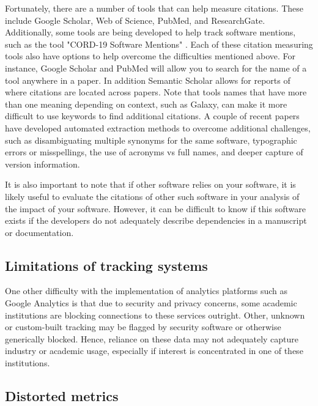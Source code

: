 \documentclass{article}
\begin{document}
Fortunately, there are a number of tools that can help measure citations. These include Google Scholar, Web of Science, PubMed, and ResearchGate. Additionally, some tools are being developed to help track software mentions, such as the tool "CORD-19 Software Mentions" \cite{wade_cord-19_2021}. Each of these citation measuring tools also have options to help overcome the difficulties mentioned above. For instance, Google Scholar and PubMed will allow you to search for the name of a tool anywhere in a paper. In addition Semantic Scholar allows for reports of where citations are located across papers. Note that tools names that have more than one meaning depending on context, such as Galaxy, can make it more difficult to use keywords to find additional citations. A couple of recent papers \cite{istrate_large_2022, schindler_role_2022} have developed automated extraction methods to overcome additional challenges, such as disambiguating multiple synonyms for the same software, typographic errors or misspellings, the use of acronyms vs full names, and deeper capture of version information. 

It is also important to note that if other software relies on your software, it is likely useful to evaluate the citations of other such software in your analysis of the impact of your software. However, it can be difficult to know if this software exists if the developers do not adequately describe dependencies in a manuscript or documentation.

\subsection{Limitations of tracking systems}
One other difficulty with the implementation of analytics platforms such as Google Analytics is that due to security and privacy concerns, some academic institutions are blocking connections to these services outright. Other, unknown or custom-built tracking may be flagged by security software or otherwise generically blocked. Hence, reliance on these data may not adequately capture industry or academic usage, especially if interest is concentrated in one of these institutions.

\subsection{Distorted metrics}
\end{document}
